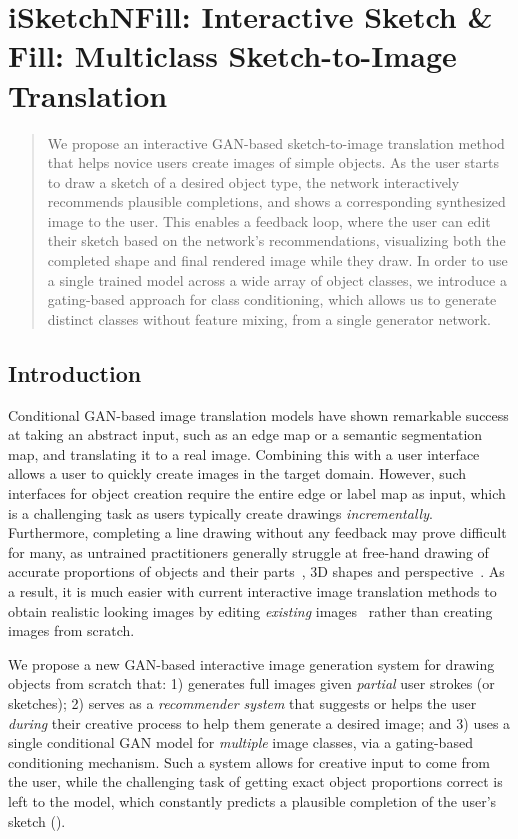 \chapter{iSketchNFill: Interactive Sketch \& Fill: Multiclass Sketch-to-Image Translation}

\begin{abstract}
	We propose an interactive GAN-based sketch-to-image translation method that helps novice users create images of simple objects.
	As the user starts to draw a sketch of a desired object type, the network interactively recommends plausible completions, and shows a corresponding synthesized image to the user. This enables a feedback loop, where the user can edit their sketch based on the network's recommendations, visualizing both the completed shape and final rendered image while they draw.
	In order to use a single trained model across a wide array of object classes, we introduce a gating-based approach for class conditioning, which allows us to generate distinct classes without feature mixing, from a single generator network. 
\end{abstract}

\section{Introduction}
Conditional GAN-based image translation \cite{isola2016image2image,sangkloy2017scribbler,zhu2017unpaired} models have shown remarkable success at taking an abstract input, such as an edge map or a semantic segmentation map, and translating it to a real image. Combining this with a user interface allows a user to quickly create images in the target domain. 
However, such interfaces for object creation require the entire edge or label map as input, which is a challenging task as users typically create drawings \emph{incrementally}.
Furthermore, completing a line drawing without any feedback may prove difficult for many, as untrained practitioners generally struggle at free-hand drawing of accurate proportions of objects and their parts~\cite{cohen1997can}, 3D shapes and perspective~\cite{schmidt2009expert}. 
As a result, it is much easier with current interactive image translation methods to obtain realistic looking images by editing \emph{existing} images~\cite{dekel2018sparse,portenier2018faceshop} rather than creating images from scratch. 

We propose a new GAN-based interactive image generation system for drawing objects from scratch that: 1) generates full images given {\em partial} user strokes (or sketches); 2) serves as a \emph{recommender system} that suggests or helps the user \emph{during} their creative process to help them generate a desired image; and 3) uses a single conditional GAN model for {\em multiple} image classes, via a gating-based conditioning mechanism. Such a system allows for creative input to come from the user, while the challenging task of getting exact object proportions correct is left to the model, which constantly predicts a plausible completion of the user's sketch (). 

